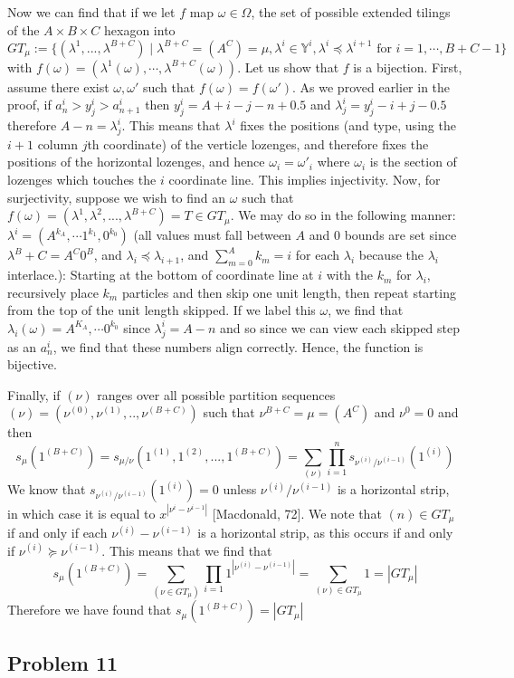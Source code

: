 \documentclass[12pt]{article}
\begin{document}
		Now we can find that if we let $f$ map $\omega\in \Omega$, the set of possible extended tilings of the $A\times B \times C$ hexagon into $$GT_\mu:=\{(\lambda^1,...,\lambda^{B+C})\mid \lambda^{B+C}=(A^C)=\mu, \lambda^i\in \mathbb{Y}^i, \lambda^i\preceq \lambda^{i+1} \text{ for } i=1, \cdots , B+C-1\}$$ with $f(\omega)=(\lambda^1(\omega), \cdots, \lambda^{B+C}(\omega))$. Let us show that $f$ is a bijection. First, assume there exist $\omega, \omega'$ such that $f(\omega)=f(\omega')$. As we proved earlier in the proof, if $a_n^i>y_j^i>a_{n+1}^i$ then $y_j^i=A+i-j-n+0.5$ and $\lambda_j^i=y_j^i-i+j-0.5$ therefore $A-n=\lambda_j^i$. This means that $\lambda^i$ fixes the positions (and type, using the $i+1$ column $j$th coordinate) of the verticle lozenges, and therefore fixes the positions of the horizontal lozenges, and hence $\omega_i=\omega'_i$ where $\omega_i$ is the section of lozenges which touches the $i$ coordinate line. This implies injectivity. Now, for surjectivity, suppose we wish to find an $\omega$ such that $f(\omega)=(\lambda^1, \lambda^2,...,\lambda^{B+C})=T\in GT_\mu$. We may do so in the following manner: $\lambda^i=(A^{k_A}, \cdots 1^{k_1}, 0^{k_0} )$ (all values must fall between $A$ and $0$ bounds are set since $\lambda^B+C=A^C0^B$, and $\lambda_i\preceq \lambda_{i+1}$, and $\sum_{m=0}^A k_m=i$ for each $\lambda_i$ because the $\lambda_i$ interlace.): Starting at the bottom of coordinate line at $i$ with the $k_m$ for $\lambda_i$, recursively place $k_m$ particles and then skip one unit length, then repeat starting from the top of the unit length skipped. If we label this $\omega$, we find that $\lambda_i(\omega)=A^{K_A},\cdots 0^{k_0}$ since $\lambda_j^i=A-n$ and so since we can view each skipped step as an $a_n^i$, we find that these numbers align correctly. Hence, the function is bijective.
		
		
		Finally, if $(\nu)$ ranges over all possible partition sequences $(\nu)=(\nu^{(0)},\nu^{(1)},..,\nu^{(B+C)})$ such that $\nu^{B+C}=\mu = (A^C)$ and $\nu^0=0$ and  then $$s_\mu(1^{(B+C)})=s_{\mu/\nu}(1^{(1)},1^{(2)},...,1^{(B+C)})=\sum_{(\nu)}\prod_{i=1}^n s_{\nu^{(i)}/\nu^{(i-1)}}(1^{(i)})$$
		We know that $s_{\nu^{(i)}/\nu^{(i-1)}}(1^{(i)})=0$ unless $\nu^{(i)}/\nu^{(i-1)}$ is a horizontal strip, in which case it is equal to $x^{|\nu^{i}-\nu^{i-1}|}$ [Macdonald, 72]. We note that $(n)\in GT_\mu$ if and only if each $\nu^{(i)}-\nu^{(i-1)}$ is a horizontal strip, as this occurs if and only if $\nu^{(i)}\succeq \nu^{(i-1)}$. This means that we find that $$s_\mu(1^{(B+C)})=\sum_{(\nu\in GT_\mu)}\prod_{i=1} 1^{|\nu^{(i)}-\nu^{(i-1)}|}=\sum_{(\nu)\in GT_\mu} 1=|GT_\mu|$$ Therefore we have found that $s_\mu(1^{(B+C)})=|GT_\mu|$
	\subsection*{Problem 11}
\end{document}
